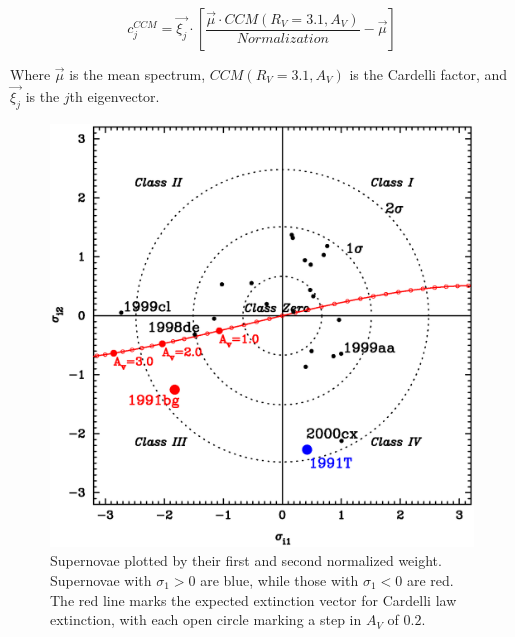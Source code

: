 $$ c_{j}^{CCM} = \vec{\xi_{j}} \cdot \left[ \frac {\vec{\mu} \cdot CCM(R_{V}=3.1,A_{V})}{Normalization} - \vec{\mu} \right] $$

Where $\vec{\mu}$ is the mean spectrum, $CCM(R_{V}=3.1,A_{V})$ is the Cardelli factor, and $\vec{\xi_{j}}$ is the $j$th eigenvector.

\begin{figure}[ht]
\begin{center}
\includegraphics[angle=0,scale=0.8]{./figures/pca/sigma1_vs_sigma2_areanorm.ps}
\end{center}
\caption{
Supernovae plotted by their first and second normalized weight. Supernovae with $\sigma_{1} > 0$ are blue, while those with $\sigma_{1} < 0$ are red. The red line marks the expected extinction vector for Cardelli law extinction, with each open circle marking a step in $A_{V}$ of $0.2$.
}
\label{fig:sig1sig2}
\end{figure}

